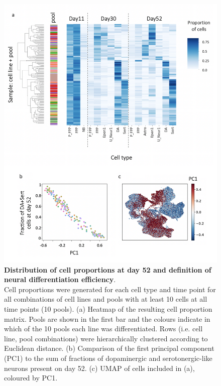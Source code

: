 \begin{figure}[htbp]
\centering
\includegraphics[width=14cm]{Chapter5/Fig/neuroseq_define_diff_efficiency.png}
\caption[Definition of neural differentiation efficiency]{\textbf{Distribution of cell proportions at day 52 and definition of neural differentiation efficiency}.\\
Cell proportions were generated for each cell type and time point for all combinations of cell lines and pools with at least 10 cells at all time points (10 pools). 
(a) Heatmap of the resulting cell proportion matrix. 
Pools are shown in the first bar and the colours indicate in which of the 10 pools each line was differentiated. 
Rows (i.e. cell line, pool combinations) were hierarchically clustered according to Euclidean distance. 
(b) Comparison of the first principal component (PC1) to the sum of fractions of dopaminergic and serotonergic-like neurons present on day 52.
(c) UMAP of cells included in (a), coloured by PC1.}
\label{fig:neuroseq_diff_efficiency}
\end{figure}

\clearpage

